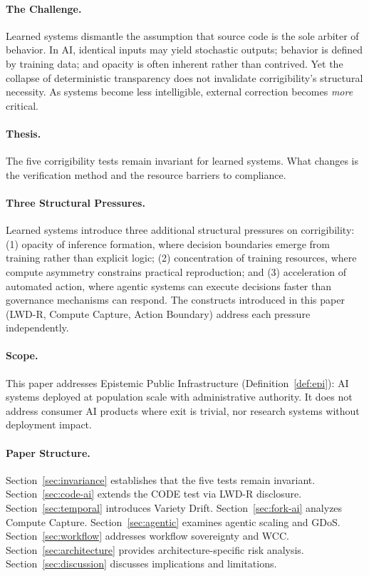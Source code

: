 \documentclass[11pt,a4paper]{article}
\theoremstyle{definition}
\begin{document}
\paragraph{The Challenge.} Learned systems dismantle the assumption that source code is the sole arbiter of behavior. In AI, identical inputs may yield stochastic outputs; behavior is defined by training data; and opacity is often inherent rather than contrived. Yet the collapse of deterministic transparency does not invalidate corrigibility's structural necessity. As systems become less intelligible, external correction becomes \textit{more} critical.

\paragraph{Thesis.} The five corrigibility tests remain invariant for learned systems. What changes is the verification method and the resource barriers to compliance.

\paragraph{Three Structural Pressures.} Learned systems introduce three additional structural pressures on corrigibility: (1) opacity of inference formation, where decision boundaries emerge from training rather than explicit logic; (2) concentration of training resources, where compute asymmetry constrains practical reproduction; and (3) acceleration of automated action, where agentic systems can execute decisions faster than governance mechanisms can respond. The constructs introduced in this paper (LWD-R, Compute Capture, Action Boundary) address each pressure independently.

\paragraph{Scope.} This paper addresses Epistemic Public Infrastructure (Definition~\ref{def:epi}): AI systems deployed at population scale with administrative authority. It does not address consumer AI products where exit is trivial, nor research systems without deployment impact.

\paragraph{Paper Structure.} Section~\ref{sec:invariance} establishes that the five tests remain invariant. Section~\ref{sec:code-ai} extends the CODE test via LWD-R disclosure. Section~\ref{sec:temporal} introduces Variety Drift. Section~\ref{sec:fork-ai} analyzes Compute Capture. Section~\ref{sec:agentic} examines agentic scaling and GDoS. Section~\ref{sec:workflow} addresses workflow sovereignty and WCC. Section~\ref{sec:architecture} provides architecture-specific risk analysis. Section~\ref{sec:discussion} discusses implications and limitations.
\end{document}
